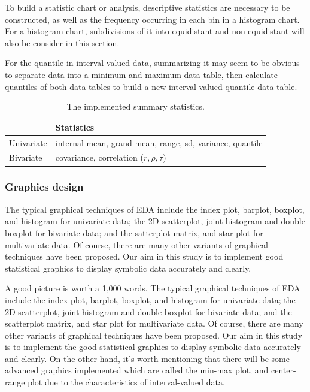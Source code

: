 \documentclass[article]{jss}
\begin{document}
To build a statistic chart or analysis, descriptive statistics are
necessary to be constructed, as well as the frequency occurring in
each bin in a histogram chart. For a histogram chart, subdivisions of
it into equidistant and non-equidistant will also be consider in this
section.

For the quantile in interval-valued data, summarizing it may seem to
be obvious to separate data into a minimum and maximum data table,
then calculate quantiles of both data tables to build a new
interval-valued quantile data table.


\begin{table}[t!]
\centering
\begin{tabular}{|l|l|} \hline
            & Statistics    \\ \hline
Univariate  & internal mean, grand mean, range, sd, variance, quantile  \\ \hline
Bivariate & covariance, correlation ($r, \rho, \tau$)\\ \hline
\end{tabular}
\caption{\label{tab:stat} The implemented summary statistics.}
\end{table}



\subsubsection{Graphics design}
The typical graphical techniques of EDA include the index plot,
barplot, boxplot, and histogram for univariate data; the 2D
scatterplot, joint histogram and double boxplot for bivariate data;
and the satterplot matrix, and star plot for multivariate data. Of
course, there are many other variants of graphical techniques have
been proposed. Our aim in this study is to implement good statistical
graphics to display symbolic data accurately and clearly.

A good picture is worth a 1,000 words. The typical graphical
techniques of EDA include the index plot, barplot, boxplot, and
histogram for univariate data; the 2D scatterplot, joint histogram and
double boxplot for bivariate data; and the scatterplot matrix, and star
plot for multivariate data. Of course, there are many other variants
of graphical techniques have been proposed. Our aim in this study is
to implement the good statistical graphics to display symbolic data
accurately and clearly. On the other hand, it's worth mentioning that
there will be some advanced graphics implemented which are called the
min-max plot, and center-range plot due to the characteristics of
interval-valued data. 
\end{document}
